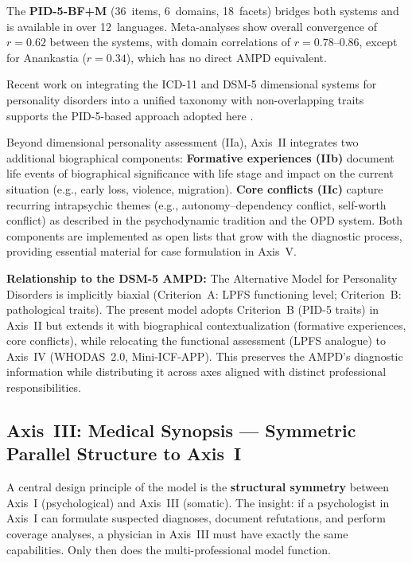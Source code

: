 \documentclass[11pt,a4paper]{article}
\begin{document}
The \textbf{PID-5-BF+M} (36~items, 6~domains, 18~facets) bridges both systems and is available in over 12~languages. Meta-analyses show overall convergence of $r = 0.62$ between the systems, with domain correlations of $r = 0.78$--$0.86$, except for Anankastia ($r = 0.34$), which has no direct AMPD equivalent.

Recent work on integrating the ICD-11 and DSM-5 dimensional systems for personality disorders into a unified taxonomy with non-overlapping traits supports the PID-5-based approach adopted here \citep{Bach2022}.

Beyond dimensional personality assessment (IIa), Axis~II integrates two additional biographical components: \textbf{Formative experiences (IIb)} document life events of biographical significance with life stage and impact on the current situation (e.g., early loss, violence, migration). \textbf{Core conflicts (IIc)} capture recurring intrapsychic themes (e.g., autonomy--dependency conflict, self-worth conflict) as described in the psychodynamic tradition and the OPD system. Both components are implemented as open lists that grow with the diagnostic process, providing essential material for case formulation in Axis~V.

\textbf{Relationship to the DSM-5 AMPD:} The Alternative Model for Personality Disorders is implicitly biaxial (Criterion~A: LPFS functioning level; Criterion~B: pathological traits). The present model adopts Criterion~B (PID-5 traits) in Axis~II but extends it with biographical contextualization (formative experiences, core conflicts), while relocating the functional assessment (LPFS analogue) to Axis~IV (WHODAS~2.0, Mini-ICF-APP). This preserves the AMPD's diagnostic information while distributing it across axes aligned with distinct professional responsibilities.

\subsection{Axis~III: Medical Synopsis --- Symmetric Parallel Structure to Axis~I}
\label{sec:axis3}

A central design principle of the model is the \textbf{structural symmetry} between Axis~I (psychological) and Axis~III (somatic). The insight: if a psychologist in Axis~I can formulate suspected diagnoses, document refutations, and perform coverage analyses, a physician in Axis~III must have exactly the same capabilities. Only then does the multi-professional model function.
\end{document}
